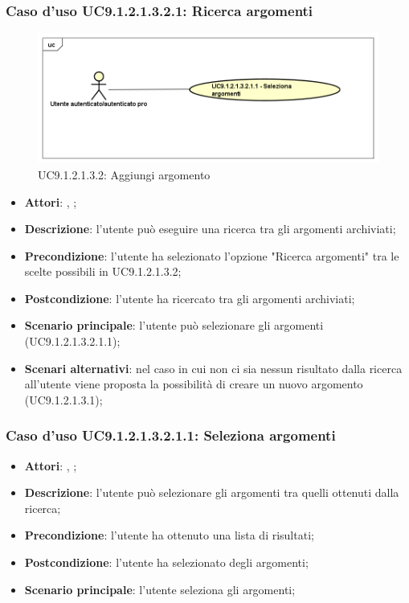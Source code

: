 							\subsubsection{Caso d'uso UC9.1.2.1.3.2.1: Ricerca argomenti}
							\label{UC9.1.2.1.3.2.1}
							\begin{figure}[h]
								\centering
								\includegraphics[scale=0.5,keepaspectratio]{UML/UC9_1_2_1_3_2_1.png}
								\caption{UC9.1.2.1.3.2: Aggiungi argomento}
							\end{figure}
							\FloatBarrier
							\begin{itemize}
								\item \textbf{Attori}: \uau, \uaupro;
								\item \textbf{Descrizione}: l'utente può eseguire una ricerca tra gli argomenti archiviati; 
								\item \textbf{Precondizione}: l'utente ha selezionato l'opzione "Ricerca argomenti" tra le scelte possibili in UC9.1.2.1.3.2;
								\item \textbf{Postcondizione}: l'utente ha ricercato tra gli argomenti archiviati;
								\item \textbf{Scenario principale}: l'utente può selezionare gli argomenti (UC9.1.2.1.3.2.1.1); 
								\item \textbf{Scenari alternativi}: nel caso in cui non ci sia nessun risultato dalla ricerca all'utente viene proposta la possibilità di creare un nuovo argomento (UC9.1.2.1.3.1);
							\end{itemize}
							
								\subsubsection{Caso d'uso UC9.1.2.1.3.2.1.1: Seleziona argomenti}
								\label{UC9.1.2.1.3.2.2}
								\begin{itemize}
									\item \textbf{Attori}: \uau, \uaupro;
									\item \textbf{Descrizione}: l'utente può selezionare gli argomenti tra quelli ottenuti dalla ricerca;
									\item \textbf{Precondizione}: l'utente ha ottenuto una lista di risultati;
									\item \textbf{Postcondizione}: l'utente ha selezionato degli argomenti; 
									\item \textbf{Scenario principale}: l'utente seleziona gli argomenti;
								\end{itemize}
						

